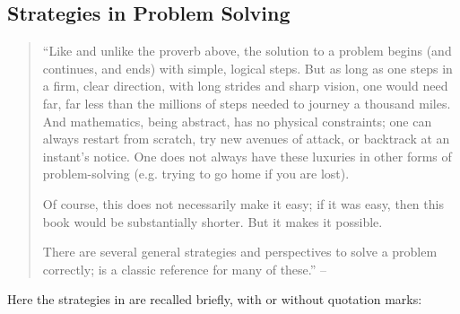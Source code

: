 \documentclass{article}
\numberwithin{equation}{section}
\begin{document}
\subsection{Strategies in Problem Solving}
\begin{quotation}
	``Like and unlike the proverb above, the solution to a problem begins (and continues, and ends) with simple, logical steps. But as long as one steps in a firm, clear direction, with long strides and sharp vision, one would need far, far less than the millions of steps needed to journey a thousand miles. And mathematics, being abstract, has no physical constraints; one can always restart from scratch, try new avenues of attack, or backtrack at an instant's notice. One does not always have these luxuries in other forms of problem-solving (e.g. trying to go home if you are lost).
	
	Of course, this does not necessarily make it easy; if it was easy, then this book would be substantially shorter. But it makes it possible.
	
	There are several general strategies and perspectives to solve a problem correctly; \cite{Polya2014} is a classic reference for many of these.'' -- \cite[Chap. 1, p. 1]{Tao2006}
\end{quotation}
Here the strategies in \cite[Chap. 1, pp. 1--7]{Tao2006} are recalled briefly, with or without quotation marks:
\end{document}
